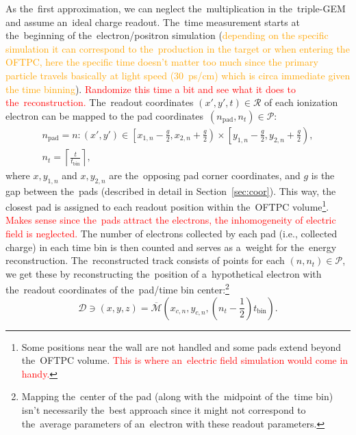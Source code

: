 		As the~first approximation, we can neglect the~multiplication in the~triple\nobreakdash-\ac{GEM} and assume an~ideal charge readout. The~time measurement starts at the~beginning of the~electron/positron simulation (\textcolor{orange}{depending on the specific simulation it can correspond to the~production in the target or when entering the OFTPC, here the specific time doesn't matter too much since the primary particle travels basically at light speed (30~ps/cm) which is circa immediate given the time binning}). \textcolor{red}{Randomize this time a bit and see what it does to the~reconstruction.} The~readout coordinates ${(x',y',t)\in\mathcal{R}}$ of each ionization electron can be mapped to the pad coordinates~$(n_\text{pad},n_t) \in \mathcal{P}$:
			\begin{gather}
				n_\text{pad} = n\colon (x',y') \in \left[x_{1,n}-\frac{g}{2},x_{2,n}+\frac{g}{2}\right)\times\left[y_{1,n}-\frac{g}{2},y_{2,n}+\frac{g}{2}\right),\\
				n_t = \left\lceil \frac{t}{t_\text{bin}}\right\rceil,
			\end{gather}
		where $x,y_{1,n}$ and $x,y_{2,n}$ are the~opposing pad corner coordinates, and $g$ is the gap between the~pads (described in detail in Section~\ref{sec:coor}). This way, the closest pad is assigned to each readout position within the~\ac{OFTPC} volume\footnote{Some positions near the wall are not handled and some pads extend beyond the~\ac{OFTPC} volume. \textcolor{red}{This is where an~electric field simulation would come in handy.}}. \textcolor{red}{Makes sense since the~pads attract the electrons, the inhomogeneity of electric field is neglected.} The number of electrons collected by each pad (i.e., collected charge) in each time bin is then counted and serves as a~weight for the~energy reconstruction. The~reconstructed track consists of points for each $(n,n_t)\in\mathcal{P}$, we get these by reconstructing the~position of a~hypothetical electron with the~readout coordinates of the~pad/time bin center:\footnote{Mapping the~center of the pad (along with the~midpoint of the~time bin) isn't necessarily the~best approach since it might not correspond to the~average parameters of an~electron with these readout parameters.}
			\begin{equation}
				\mathcal{D} \ni (x,y,z) = \overbar{\mathcal{M}}\left(x_{c,n},y_{c,n},\left(n_t-\frac{1}{2}\right)t_\text{bin}\right).
			\end{equation}